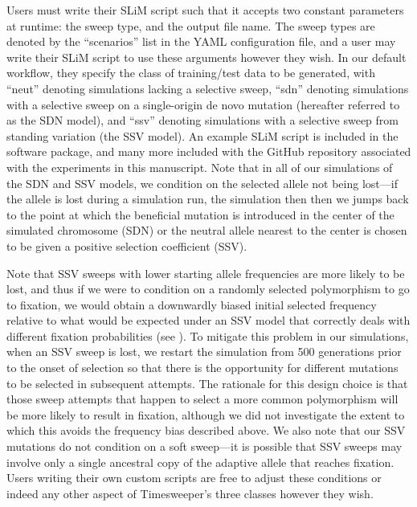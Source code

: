 Users must write their SLiM script such that it accepts two constant parameters at runtime: the sweep type, and the output file name. The sweep types are denoted by the “scenarios” list in the YAML configuration file, and a user may write their SLiM script to use these arguments however they wish. In our default workflow, they specify the class of training/test data to be generated, with “neut” denoting simulations lacking a selective sweep, “sdn” denoting simulations with a selective sweep on a single-origin de novo mutation (hereafter referred to as the SDN model), and “ssv” denoting simulations with a selective sweep from standing variation (the SSV model). An example SLiM script is included in the software package, and many more included with the GitHub repository associated with the experiments in this manuscript. Note that in all of our simulations of the SDN and SSV models, we condition on the selected allele not being lost—if the allele is lost during a simulation run, the simulation then then we jumps back to the point at which the beneficial mutation is introduced in the center of the simulated chromosome (SDN) or the neutral allele nearest to the center is chosen to be given a positive selection coefficient (SSV).

Note that SSV sweeps with lower starting allele frequencies are more likely to be lost, and thus if we were to condition on a randomly selected polymorphism to go to fixation, we would obtain a downwardly biased initial selected frequency relative to what would be expected under an SSV model that correctly deals with different fixation probabilities (see \cite{hermissonSoftSweepsUnderstanding2017}). To mitigate this problem in our simulations, when an SSV sweep is lost, we restart the simulation from 500 generations prior to the onset of selection so that there is the opportunity for different mutations to be selected in subsequent attempts. The rationale for this design choice is that those sweep attempts that happen to select a more common polymorphism will be more likely to result in fixation, although we did not investigate the extent to which this avoids the frequency bias described above. We also note that our SSV mutations do not condition on a soft sweep—it is possible that SSV sweeps may involve only a single ancestral copy of the adaptive allele that reaches fixation. Users writing their own custom scripts are free to adjust these conditions or indeed any other aspect of Timesweeper’s three classes however they wish. 

